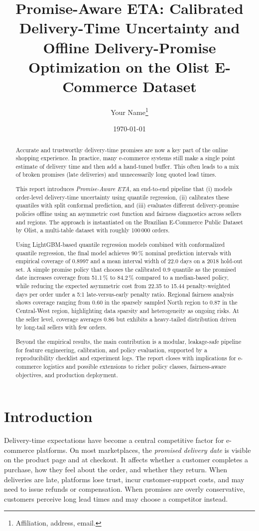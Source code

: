 \documentclass[10pt,twocolumn]{article}
\title{Promise-Aware ETA: Calibrated Delivery-Time Uncertainty and Offline Delivery-Promise Optimization on the Olist E-Commerce Dataset}
\author{
  Your Name\thanks{Affiliation, address, email.}
}
\date{\today}
\begin{document}
\maketitle

\begin{abstract}
Accurate and trustworthy delivery-time promises are now a key part of the online shopping experience. In practice, many e-commerce systems still make a single point estimate of delivery time and then add a hand-tuned buffer. This often leads to a mix of broken promises (late deliveries) and unnecessarily long quoted lead times. 

This report introduces \emph{Promise-Aware ETA}, an end-to-end pipeline that (i) models order-level delivery-time uncertainty using quantile regression, (ii) calibrates these quantiles with split conformal prediction, and (iii) evaluates different delivery-promise policies offline using an asymmetric cost function and fairness diagnostics across sellers and regions. The approach is instantiated on the Brazilian E-Commerce Public Dataset by Olist, a multi-table dataset with roughly 100\,000 orders.

Using LightGBM-based quantile regression models combined with conformalized quantile regression, the final model achieves 90\,\% nominal prediction intervals with empirical coverage of 0.8997 and a mean interval width of 22.0 days on a 2018 hold-out set. A simple promise policy that chooses the calibrated 0.9 quantile as the promised date increases coverage from 51.1\,\% to 84.2\,\% compared to a median-based policy, while reducing the expected asymmetric cost from 22.35 to 15.44 penalty-weighted days per order under a 5:1 late-versus-early penalty ratio. Regional fairness analysis shows coverage ranging from 0.60 in the sparsely sampled North region to 0.87 in the Central-West region, highlighting data sparsity and heterogeneity as ongoing risks. At the seller level, coverage averages 0.86 but exhibits a heavy-tailed distribution driven by long-tail sellers with few orders.

Beyond the empirical results, the main contribution is a modular, leakage-safe pipeline for feature engineering, calibration, and policy evaluation, supported by a reproducibility checklist and experiment logs. The report closes with implications for e-commerce logistics and possible extensions to richer policy classes, fairness-aware objectives, and production deployment.
\end{abstract}

\section{Introduction}
Delivery-time expectations have become a central competitive factor for e-commerce platforms. On most marketplaces, the \emph{promised delivery date} is visible on the product page and at checkout. It affects whether a customer completes a purchase, how they feel about the order, and whether they return. When deliveries are late, platforms lose trust, incur customer-support costs, and may need to issue refunds or compensation. When promises are overly conservative, customers perceive long lead times and may choose a competitor instead.
\end{document}
